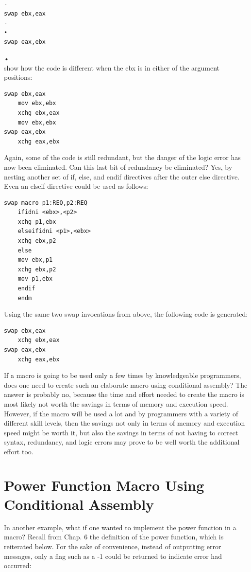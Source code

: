 \documentclass[10pt]{book}
\begin{document}
\begin{verbatim}
-
swap ebx,eax
-
•
swap eax,ebx
\end{verbatim}

•\\
show how the code is different when the ebx is in either of the argument positions:

\begin{verbatim}
swap ebx,eax
    mov ebx,ebx
    xchg ebx,eax
    mov ebx,ebx
swap eax,ebx
    xchg eax,ebx
\end{verbatim}

Again, some of the code is still redundant, but the danger of the logic error has now been eliminated. Can this last bit of redundancy be eliminated? Yes, by nesting another set of if, else, and endif directives after the outer else directive. Even an elseif directive could be used as follows:

\begin{verbatim}
swap macro p1:REQ,p2:REQ
    ifidni <ebx>,<p2>
    xchg p1,ebx
    elseifidni <p1>,<ebx>
    xchg ebx,p2
    else
    mov ebx,p1
    xchg ebx,p2
    mov p1,ebx
    endif
    endm
\end{verbatim}

Using the same two swap invocations from above, the following code is generated:

\begin{verbatim}
swap ebx,eax
    xchg ebx,eax
swap eax,ebx
    xchg eax,ebx
\end{verbatim}

If a macro is going to be used only a few times by knowledgeable programmers, does one need to create such an elaborate macro using conditional assembly? The answer is probably no, because the time and effort needed to create the macro is most likely not worth the savings in terms of memory and execution speed. However, if the macro will be used a lot and by programmers with a variety of different skill levels, then the savings not only in terms of memory and execution speed might be worth it, but also the savings in terms of not having to correct syntax, redundancy, and logic errors may prove to be well worth the additional effort too.

\section{Power Function Macro Using Conditional Assembly}
In another example, what if one wanted to implement the power function in a macro? Recall from Chap. 6 the definition of the power function, which is reiterated below. For the sake of convenience, instead of outputting error messages, only a flag such as a -1 could be returned to indicate error had occurred:
\end{document}
